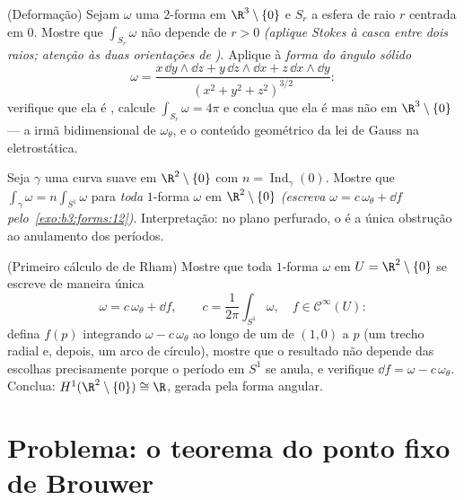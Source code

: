 \begin{exercise}[$\star\star\star$]\label{exo:b3:forms:10}
(Deformação) Sejam $\omega$ uma $2$-forma \emph{} em $\R^3\setminus\{0\}$
e $S_r$ a esfera de raio $r$ centrada em $0$. Mostre que
$\int_{S_r}\omega$ não depende de $r > 0$ \emph{(aplique Stokes à casca entre dois
raios; atenção às duas orientações de )}. Aplique à \emph{forma do
ângulo sólido}
\[
\omega = \frac{x\,\dd y\wedge\dd z + y\,\dd z\wedge\dd x +
z\,\dd x\wedge\dd y}{(x^2 + y^2 + z^2)^{3/2}} :
\]
verifique que ela é , calcule $\int_{S_r}\omega = 4\pi$ e conclua que ela é 
mas não  em $\R^3\setminus\{0\}$ --- a irmã bidimensional de $\omega_\theta$, e o conteúdo
geométrico da lei de Gauss na eletrostática.
\end{exercise}

\begin{exercise}[$\star\star$]\label{exo:b3:forms:11}
Seja $\gamma$ uma curva  suave em $\R^2\setminus\{0\}$ com $n = \operatorname{Ind}_\gamma(0)$. Mostre que
$\int_\gamma\omega = n\int_{S^1}\omega$ para \emph{toda} $1$-forma  $\omega$ em $\R^2\setminus\{0\}$
\emph{(escreva $\omega = c\,\omega_\theta
+ \dd f$ pelo~\cref{exo:b3:forms:12})}. Interpretação: no plano
perfurado, o  é a única obstrução ao anulamento dos
períodos.
\end{exercise}

\begin{exercise}[$\star\star\star$]\label{exo:b3:forms:12}
(Primeiro cálculo de de Rham) Mostre que toda $1$-forma 
$\omega$ em $U = \R^2\setminus\{0\}$ se escreve de maneira única
\[
\omega = c\,\omega_\theta + \dd f,
\qquad c = \frac1{2\pi}\int_{S^1}\omega,\quad f \in
\mathcal C^\infty(U) :
\]
defina $f(p)$ integrando $\omega - c\,\omega_\theta$ ao longo de um  de $(1,0)$
a $p$ (um trecho radial e, depois, um arco de círculo), mostre que o
resultado não depende das escolhas precisamente porque o período em
$S^1$ se anula, e verifique $\dd
f = \omega - c\,\omega_\theta$. Conclua: $H^1(\R^2\setminus\{0\}) \cong \R$, gerada pela forma
angular.
\end{exercise}

\section{Problema: o teorema do ponto fixo de Brouwer}

